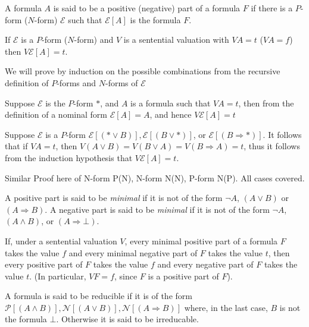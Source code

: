\documentclass[nobib,notoc]{tufte-handout}
\begin{document}
\begin{defi}
	A formula \(A\) is said to be a positive (negative) part of a formula \(F\) if there is a \(P\)-form (\(N\)-form) \(\mathscr{E}\) such that \(\mathscr{E}[A]\) is the formula \(F\).
\end{defi}
\begin{thm}
	If \(\mathscr{E}\) is a \(P\)-form (\(N\)-form) and \(V\) is a sentential valuation with \(VA=t\) (\(VA=f\)) then \(V\mathscr{E}[A]=t\).
\begin{IEEEproof}
	We will prove by induction on the possible combinations from the recursive definition of \(P\)-forms and \(N\)-forms of \(\mathscr{E}\)\par
	Suppose \(\mathscr{E}\) is the \(P\)-form \(*\), and \(A\) is a formula such that \(VA=t\), then from the definition of a nominal form \(\mathscr{E}[A]=A\), and hence \(V\mathscr{E}[A]=t\)\par
	Suppose \(\mathscr{E}\) is a \(P\)-form \(\mathscr{E}[(*\vee B)], \mathscr{E}[(B\vee *)]\), or \(\mathscr{E}[(B\Rightarrow *)]\). It follows that if \(VA=t\), then \(V(A\vee B)=V(B\vee A)=V(B\Rightarrow A)=t\), thus it follows from the induction hypothesis that \(V\mathscr{E}[A]=t\).\par
	Similar Proof here of N-form P(N), N-form N(N), P-form N(P). All cases covered.
\end{IEEEproof}
\end{thm}
\begin{defi}
	A positive part is said to be \emph{minimal} if it is not of the form \(\neg A\), \((A\vee B)\) or \((A\Rightarrow B)\). A negative part is said to be \emph{minimal} if it is not of the form \(\neg A\), \((A\wedge B)\), or \((A\Rightarrow \bot)\).
\end{defi}
\begin{thm}
	If, under a sentential valuation \(V\), every minimal positive part of a formula \(F\) takes the value \(f\) and every minimal negative part of \(F\) takes the value \(t\), then every positive part of \(F\) takes the value \(f\) and every negative part of \(F\) takes the value \(t\). (In particular, \(VF=f\), since \(F\) is a positive part of \(F\)).
\end{thm}
\begin{defi}[Reducable]
	A formula is said to be reducible if it is of the form \(\mathscr{P}[(A\wedge B)],\mathscr{N}[(A\vee B)], \mathscr{N}[(A\Rightarrow B)]\) where, in the last case, \(B\) is not the formula \(\bot\). Otherwise it is said to be irreducable.
\end{defi}
\end{document}
